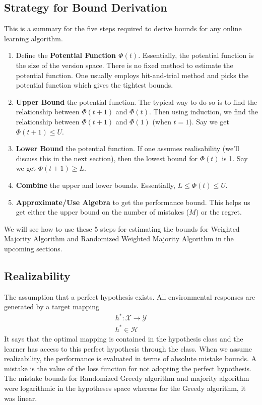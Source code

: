 \documentclass[11pt]{article}
\begin{document}
\subsection{Strategy for Bound Derivation}
This is a summary for the five steps required to derive bounds for any online learning algorithm.
\begin{enumerate}
    \item Define the \textbf{Potential Function $\Phi(t)$}. Essentially, the potential function is the size of the version space. There is no fixed method to estimate the potential function. One usually employs hit-and-trial method and picks the potential function which gives the tightest bounds.
    \item \textbf{Upper Bound} the potential function. The typical way to do so is to find the relationship between $\Phi(t+1)$ and $\Phi(t)$. Then using induction, we find the relationship between $\Phi(t+1)$ and $\Phi(1)$ (when $t=1$). Say we get $\Phi(t+1) \leq U$.
    \item \textbf{Lower Bound} the potential function. If one assumes realisability (we'll discuss this in the next section), then the lowest bound for $\Phi(t)$ is 1. Say we get $\Phi(t+1) \geq L$.
    \item \textbf{Combine} the upper and lower bounds. Essentially, $L \leq \Phi(t) \leq U$.
    \item \textbf{Approximate/Use Algebra} to get the performance bound. This helps us get either the upper bound on the number of mistakes ($M$) or the regret.
\end{enumerate}

We will see how to use these 5 steps for estimating the bounds for Weighted Majority Algorithm and Randomized Weighted Majority Algorithm in the upcoming sections.


\subsection{Realizability}

\normalfont
The assumption that a perfect hypothesis exists. All environmental responses are generated by a target mapping 
\begin{align*}
   h^{*} : \mathcal{X} \rightarrow \mathcal{Y}
   \\
   h^{*} \in \mathcal{H}
\end{align*}
It says that the optimal mapping is contained in the hypothesis class and the learner has access to this perfect hypothesis through the class.
When we assume realizability, the performance is evaluated in terms of absolute mistake bounds. A mistake is the value of the loss function for not adopting the perfect hypothesis. The mistake bounds for Randomized Greedy algorithm and majority algorithm were logarithmic in the hypotheses space whereas for the Greedy algorithm, it was linear.
\end{document}
